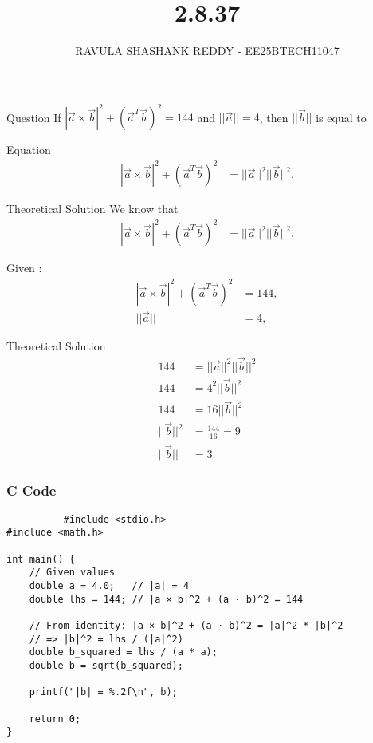 \documentclass{beamer}
\title %
{2.8.37}
\author %
{RAVULA SHASHANK REDDY - EE25BTECH11047}
\begin{document}
	
	
	\frame{\titlepage}
	\begin{frame}{Question}
If $|\vec{a}\times \vec{b}|^2 + (\vec{a}^T \vec{b})^2 = 144$ and $||\vec{a}|| = 4$, then $||\vec{b}||$ is equal to \underline{\hspace{2cm}}\\
\end{frame}

\begin{frame}{Equation}
\begin{align*}
|\vec{a}\times \vec{b}|^2 + (\vec{a}^T \vec{b})^2
&= ||\vec{a}||^2||\vec{b}||^2.
\end{align*}
    
\end{frame}
\begin{frame}{Theoretical Solution}
We know that
    \begin{align}
|\vec{a}\times \vec{b}|^2 + (\vec{a}^T \vec{b})^2
&= ||\vec{a}||^2||\vec{b}||^2.
\end{align}

Given :
\begin{align}
|\vec{a}\times \vec{b}|^2 + (\vec{a}^T \vec{b})^2 &= 144, \\
||\vec{a}|| &= 4,
\end{align}
\end{frame}
\begin{frame}{Theoretical Solution}
\begin{align}
144 &= ||\vec{a}||^2||\vec{b}||^2 \\
144 &= 4^2||\vec{b}||^2 \\
144 &= 16||\vec{b}||^2 \\
||\vec{b}||^2 &= \frac{144}{16} = 9 \\
||\vec{b}|| &= 3.
\end{align}

\end{frame}
\begin{frame}[fragile]
     \frametitle{C Code}
      \begin{lstlisting}
          #include <stdio.h>
#include <math.h>

int main() {
    // Given values
    double a = 4.0;   // |a| = 4
    double lhs = 144; // |a × b|^2 + (a · b)^2 = 144

    // From identity: |a × b|^2 + (a · b)^2 = |a|^2 * |b|^2
    // => |b|^2 = lhs / (|a|^2)
    double b_squared = lhs / (a * a);
    double b = sqrt(b_squared);

    printf("|b| = %.2f\n", b);

    return 0;
}
      \end{lstlisting}
\end{frame}
\end{document}
